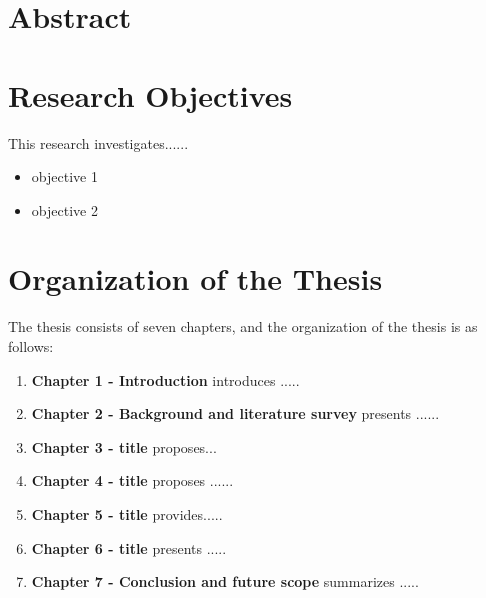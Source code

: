 \documentclass[12pt,a4paper,oneside]{report}
\begin{document}
\section{Abstract}










\section{Research Objectives}
This research investigates......
\begin{itemize}
  \item objective 1
  \item objective 2
\end{itemize}






\newpage
\section{Organization of the Thesis}
The thesis consists  of seven  chapters, and the organization of the thesis is as follows:
\begin{enumerate}
    \item \textbf{Chapter 1 - Introduction} introduces .....
    \item \textbf{Chapter 2 - Background and literature survey} presents ......
    \item \textbf{Chapter 3 - title} proposes...

    \item \textbf{Chapter 4 - title} proposes ......

    \item \textbf{Chapter 5 - title} provides.....

    \item \textbf{Chapter 6 - title}  presents .....
    
    \item \textbf{Chapter 7 - Conclusion and future scope} summarizes  .....

\end{enumerate}
\end{document}
